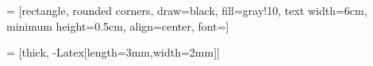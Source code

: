 
 = [rectangle, rounded corners,
                     draw=black, fill=gray!10,
                     text width=6cm, minimum height=0.5cm,
                     align=center, font=\small]

 = [thick, -{Latex[length=3mm,width=2mm]}]
\thispagestyle{empty}
\setcounter{page}{0}
\newpage
\text{}
\clearpage
\thispagestyle{empty}
\tableofcontents
\clearpage
\newpage
\thispagestyle{empty}
\setcounter{page}{0}
\text{}
\newpage
